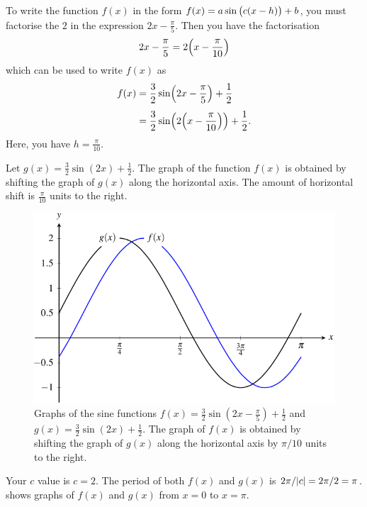 \documentclass[a4paper,oneside,12pt]{article}
\begin{document}
\begin{solution}
To write the function $f(x)$ in the form
$f(x) = a \sin\big(c (x - h)\big) + b$, you must factorise the $2$ in
the expression $2x - \frac{\pi}{5}$.  Then you have the factorisation
\[
2x - \frac{\pi}{5}
=
2
\parenthesis*{x - \frac{\pi}{10}}
\]
which can be used to write $f(x)$ as
\begin{align*}
f(x)
&=
\frac{3}{2} \sinp{2x - \frac{\pi}{5}} + \frac{1}{2} \\[4pt]
&=
\frac{3}{2} \sinp{2 \parenthesis*{x - \frac{\pi}{10}}} + \frac{1}{2}.
\end{align*}
Here, you have $h = \frac{\pi}{10}$.

Let $g(x) = \frac{3}{2} \sin(2x) + \frac{1}{2}$.  The graph of the
function $f(x)$ is obtained by shifting the graph of $g(x)$ along the
horizontal axis.  The amount of horizontal shift is $\frac{\pi}{10}$
units to the right.

\begin{figure}[!htbp]
\centering
\includegraphics[scale=1.1]{image/13/sin-right-shift-pi-10.pdf}
\caption{%
  Graphs of the sine functions
  $f(x) = \frac{3}{2} \sin(2x - \frac{\pi}{5}) + \frac{1}{2}$ and
  $g(x) = \frac{3}{2} \sin(2x) + \frac{1}{2}$.  The graph of $f(x)$ is
  obtained by shifting the graph of $g(x)$ along the horizontal axis
  by $\pi/10$ units to the right.
}
\label{fig:trigonometric:sin_right_shift_pi_10}
\end{figure}

Your $c$ value is $c = 2$.  The period of both $f(x)$ and $g(x)$ is
$2\pi / \lvert c\rvert = 2\pi/2 = \pi$.
 shows graphs of
$f(x)$ and $g(x)$ from $x = 0$ to $x = \pi$.
\end{solution}
\end{document}
